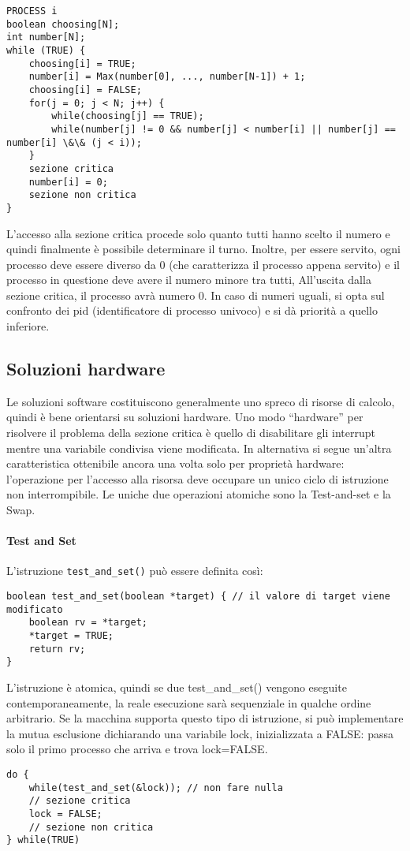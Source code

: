 \documentclass[a4]{article}
\begin{document}
\begin{verbatim}
PROCESS i
boolean choosing[N];
int number[N];
while (TRUE) {
    choosing[i] = TRUE;
    number[i] = Max(number[0], ..., number[N-1]) + 1;
    choosing[i] = FALSE;
    for(j = 0; j < N; j++) {
        while(choosing[j] == TRUE);
        while(number[j] != 0 && number[j] < number[i] || number[j] == number[i] \&\& (j < i));
    }
    sezione critica
    number[i] = 0;
    sezione non critica
}
\end{verbatim}
L'accesso alla sezione critica procede solo quanto tutti hanno scelto il numero e quindi finalmente è possibile determinare il turno. Inoltre, per essere servito, ogni processo deve essere diverso da 0 (che caratterizza il processo appena servito) e il processo in questione deve avere il numero minore tra tutti, All'uscita dalla sezione critica, il processo avrà numero 0. In caso di numeri uguali, si opta sul confronto dei pid (identificatore di processo univoco) e si dà priorità a quello inferiore.

\subsection{Soluzioni hardware}
Le soluzioni software costituiscono generalmente uno spreco di risorse di calcolo, quindi è bene orientarsi su soluzioni hardware. Uno modo ``hardware'' per risolvere il problema della sezione critica è quello di disabilitare gli interrupt mentre una variabile condivisa viene modificata. In alternativa si segue un’altra caratteristica ottenibile ancora una volta solo per proprietà hardware: l’operazione per l’accesso alla risorsa deve occupare un unico ciclo di istruzione non interrompibile. Le uniche due operazioni atomiche sono la Test-and-set e la Swap.
\paragraph{Test and Set}
L'istruzione \texttt{test\_and\_set()} può essere definita così:
\begin{verbatim}
boolean test_and_set(boolean *target) { // il valore di target viene modificato
    boolean rv = *target;
    *target = TRUE;
    return rv;
}
\end{verbatim}
L'istruzione è atomica, quindi se due test\_and\_set() vengono eseguite contemporaneamente, la reale esecuzione sarà sequenziale in qualche ordine arbitrario. Se la macchina supporta questo tipo di istruzione, si può implementare la mutua esclusione dichiarando una variabile lock, inizializzata a FALSE: passa solo il primo processo che arriva e trova lock=FALSE.
\begin{verbatim}
do {
    while(test_and_set(&lock)); // non fare nulla
    // sezione critica
    lock = FALSE;
    // sezione non critica
} while(TRUE)
\end{verbatim}
\end{document}
